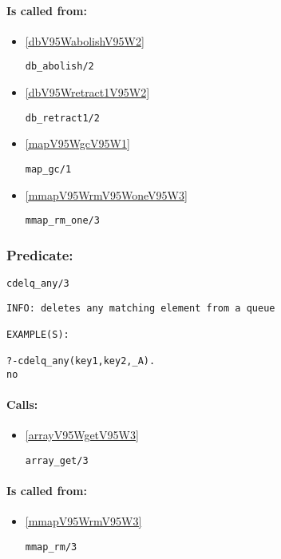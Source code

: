 \paragraph{Is called from:} 
\begin{itemize}
\item \ref{dbV95WabolishV95W2} 
\begin{verbatim}
db_abolish/2
\end{verbatim}

\item \ref{dbV95Wretract1V95W2} 
\begin{verbatim}
db_retract1/2
\end{verbatim}

\item \ref{mapV95WgcV95W1} 
\begin{verbatim}
map_gc/1
\end{verbatim}

\item \ref{mmapV95WrmV95WoneV95W3} 
\begin{verbatim}
mmap_rm_one/3
\end{verbatim}

\end{itemize}

\subsubsection{Predicate:} \label{cdelqV95WanyV95W3}

\begin{verbatim}
cdelq_any/3
\end{verbatim}

{\small \begin{verbatim}
INFO: deletes any matching element from a queue

EXAMPLE(S):

?-cdelq_any(key1,key2,_A).
no

\end{verbatim}}
\paragraph{Calls:} 
\begin{itemize}
\item \ref{arrayV95WgetV95W3} 
\begin{verbatim}
array_get/3
\end{verbatim}

\end{itemize}
\paragraph{Is called from:} 
\begin{itemize}
\item \ref{mmapV95WrmV95W3} 
\begin{verbatim}
mmap_rm/3
\end{verbatim}

\end{itemize}

